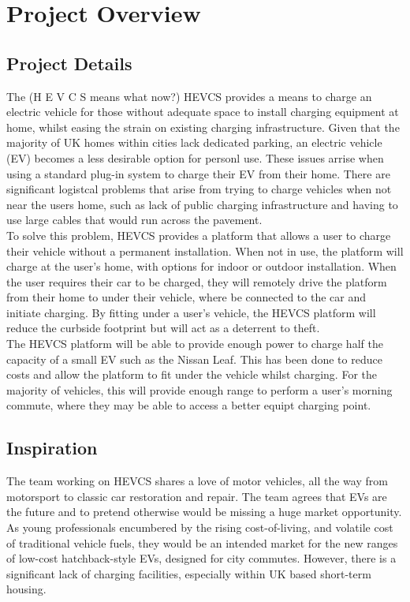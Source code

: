 \documentclass [12pt]{article}
\begin{document}
\section{Project Overview}\label{sec:project_overview}
\subsection{Project Details}\label{sec:project_details}

The (H E V C S means what now?) HEVCS provides a means to charge an electric vehicle for those without adequate space to install charging equipment at home, whilst easing the strain on existing charging infrastructure.
Given that the majority of UK homes within cities lack dedicated parking, an electric vehicle (EV) becomes a less desirable option for personl use.
These issues arrise when using a standard plug-in system to charge their EV from their home.
There are significant logistcal problems that arise from trying to charge vehicles when not near the users home, such as lack of public charging infrastructure and having to use large cables that would run across the pavement.
\\
To solve this problem, HEVCS provides a platform that allows a user to charge their vehicle without a permanent installation.
When not in use, the platform will charge at the user's home, with options for indoor or outdoor installation.
When the user requires their car to be charged, they will remotely drive the platform from their home to under their vehicle, where be connected to the car and initiate charging.
By fitting under a user's vehicle, the HEVCS platform will reduce the curbside footprint but will act as a deterrent to theft.
\\
The HEVCS platform will be able to provide enough power to charge half the capacity of a small EV such as the Nissan Leaf.
This has been done to reduce costs and allow the platform to fit under the vehicle whilst charging.
For the majority of vehicles, this will provide enough range to perform a user's morning commute, where they may be able to access a better equipt charging point.

\subsection{Inspiration}\label{sec:inspiration}

The team working on HEVCS shares a love of motor vehicles, all the way from motorsport to classic car restoration and repair.
The team agrees that EVs are the future and to pretend otherwise would be missing a huge market opportunity.
As young professionals encumbered by the rising cost-of-living, and volatile cost of traditional vehicle fuels, they would be an intended market for the new ranges of low-cost hatchback-style EVs, designed for city commutes.
However, there is a significant lack of charging facilities, especially within UK based short-term housing.
\end{document}
